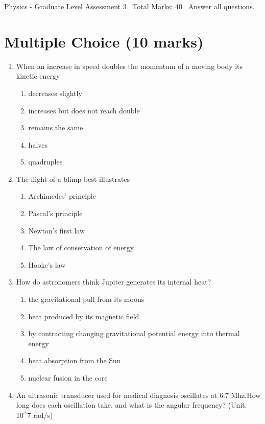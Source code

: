 \documentclass[12pt]{article}
\begin{document}
\begin{center}
Physics - Graduate Level Assessment 3 \
Total Marks: 40 \
Answer all questions.
\end{center}

\section*{Multiple Choice (10 marks)}
\begin{enumerate}[label=\arabic*.]
\item When an increase in speed doubles the momentum of a moving body its kinetic energy
\begin{enumerate}[label=(\alph*)]
    \item decreases slightly
    \item increases but does not reach double
    \item remains the same
    \item halves
    \item quadruples
\end{enumerate}
\item The flight of a blimp best illustrates
\begin{enumerate}[label=(\alph*)]
    \item Archimedes' principle
    \item Pascal's principle
    \item Newton's first law
    \item The law of conservation of energy
    \item Hooke's law
\end{enumerate}
\item How do astronomers think Jupiter generates its internal heat?
\begin{enumerate}[label=(\alph*)]
    \item the gravitational pull from its moons
    \item heat produced by its magnetic field
    \item by contracting changing gravitational potential energy into thermal energy
    \item heat absorption from the Sun
    \item nuclear fusion in the core
\end{enumerate}
\item An ultrasonic transducer used for medical diagnosis oscillates at 6.7 Mhz.How long does
each oscillation take, and what is the angular frequency? (Unit: 10\^{}7 rad/s)
\begin{enumerate}[label=(\alph*)]

\end{enumerate}
\end{enumerate}
\end{document}
